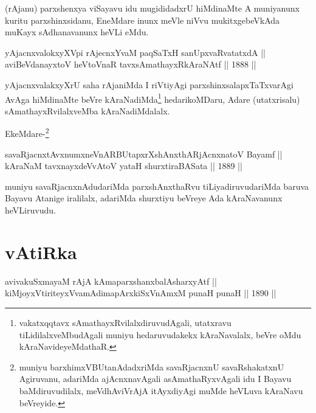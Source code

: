 \begin{artha}
(rAjanu) parxshenxya viSayavu idu mugididadxrU hiMdinaMte
A muniyanunx kuritu parxshinxsidanu, EneMdare inunx meVle niVvu
mukitxgebeVkAda muKayx sAdhanavanunx heVLi eMdu.
\end{artha}

\begin{shl}
yAjacnxvalokxyXV\s pi rAjecnxYvaM paqSaTxH sanUpxvaRvatatxdA || \\
aviBeVdanayxtoV heVtoVnaR tavxsAmathayxRkAraNAtf \hfill || 1888 ||
  
\end{shl}

\begin{artha}
yAjacnxvalakxyXrU saha rAjaniMda I riVtiyAgi parxshinxsalapxTaTxvarAgi
AvAga hiMdinaMte beVre kAraNadiMda\footnote[3]{vakatxqqtavx
sAmathayxRvilalxdiruvudAgali, utatxravu tiLidilalxveMbudAgali muniyu
hedaruvudakekx kAraNavalalx, beVre oMdu kAraNavideyeMdathaR.} hedarikoMDaru, Adare
(utatxrisalu) sAmathayxRvilalxveMba kAraNadiMdalalx.

EkeMdare-\footnote[4]{muniyu barxhimxVBUtanAdadxriMda savaRjacnxnU
savaRshakatxnU Agiruvanu, adariMda ajAcnxnavAgali asAmathaRyxvAgali
idu I Bayavu baMdiruvudilalx, meVdhAviVrAjA itAyxdiyAgi muMde
heVLuva kAraNavu beVreyide.}
\end{artha}

\begin{shl}
savaRjacnxtAvxnumxneVnARBUtapxrXshAnxthARjAcnxnatoV Bayamf ||  \\
kAraNaM tavxnayxdeVvAtoV yataH shurxtiraBASata \hfill || 1889 ||
  
\end{shl}

\begin{artha}
muniyu savaRjacnxnAdudariMda parxshAnxthaRvu tiLiyadiruvudariMda
baruva Bayavu Atanige iralilalx, adariMda shurxtiyu beVreye Ada
kAraNavanunx heVLiruvudu.
\end{artha}

\section*{vAtiRka}

\begin{shl}
avivakuSxmayaM rAjA kAmaparxshanxbalAsharxyAtf || \\
kiMjoyxVtiriteyxVvamAdimapArxkiSxVnAmxM punaH punaH \hfill || 1890 ||
  
\end{shl}

